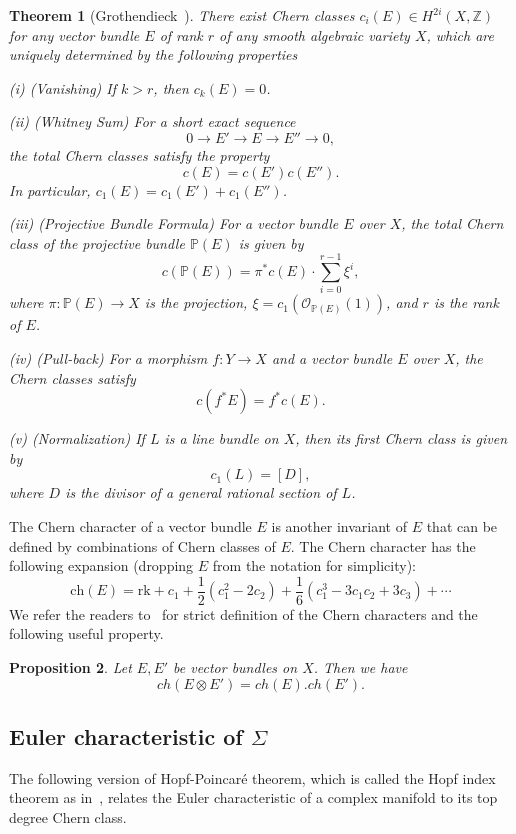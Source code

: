 \documentclass{article}
\newtheorem{theorem}{Theorem}[section]
\newtheorem{proposition}[theorem]{Proposition}
\theoremstyle{definition}
\begin{document}
\begin{theorem}[Grothendieck~\cite{Grothendieck}]
There exist Chern classes $c_i(E)\in H^{2i}(X,\mathbb Z)$ for any vector bundle $E$ of rank $r$ of any smooth algebraic variety $X$, which are uniquely determined by the following properties

(i) (Vanishing) If $k > r$, then $c_k(E) = 0$.

(ii) (Whitney Sum) For a short exact sequence
\[ 0 \to E' \to E \to E'' \to 0, \]
the total Chern classes satisfy the property
\[ c(E) = c(E')c(E''). \]
In particular, $c_1(E) = c_1(E') + c_1(E'')$.


(iii) (Projective Bundle Formula) For a vector bundle $E$ over $X$, the total Chern class of the projective bundle $\mathbb P(E)$ is given by
\[ c(\mathbb P(E)) = \pi^*c(E) \cdot \sum_{i=0}^{r-1} \xi^i, \]
where $\pi: \mathbb P(E) \to X$ is the projection, $\xi = c_1(\mathcal{O}_{\mathbb P(E)}(1))$, and $r$ is the rank of $E$.

(iv) (Pull-back) For a morphism $f: Y \to X$ and a vector bundle $E$ over $X$, the Chern classes satisfy
\[ c(f^*E) = f^*c(E). \]

(v) (Normalization) If $L$ is a line bundle on $X$, then its first Chern class is given by
\[ c_1(L) = [D], \]
where $D$ is the divisor of a general rational section of $L$.
\end{theorem}



The Chern character of a vector bundle \( E \) is another invariant of $E$ that can be defined by combinations of Chern classes of $E$. The Chern character has the following expansion (dropping \( E \) from the notation for simplicity):
\[
\mathrm{ch}(E) = \mathrm{rk} + c_1 + \frac{1}{2}(c_1^2 - 2c_2) + \frac{1}{6}(c_1^3 - 3c_1c_2 + 3c_3) + \cdots
\]
We refer the readers to~\cite[A.4]{Hartshorne} for strict definition of the Chern characters and the following useful property.

\begin{proposition}\label{PropChernChar}
    Let $E, E'$ be vector bundles on $X$. Then we have
    \[
    ch(E\otimes E') = ch(E).ch(E').
    \]
\end{proposition}

 

\subsection{Euler characteristic of $\Sigma$}
The following version of Hopf-Poincaré theorem, which is called the Hopf index theorem as in~\cite[Theorem 11.25]{BottTu}, relates the Euler characteristic of a complex manifold to its top degree Chern class.
\end{document}
